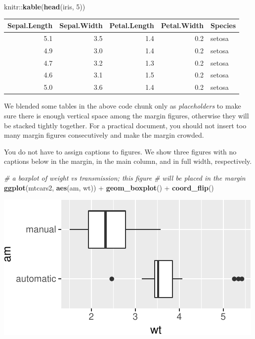 \documentclass[]{tufte-handout}
\newenvironment{Shaded}{}{}
\newcommand{\KeywordTok}[1]{\textcolor[rgb]{0.00,0.44,0.13}{\textbf{#1}}}
\newcommand{\DecValTok}[1]{\textcolor[rgb]{0.25,0.63,0.44}{#1}}
\newcommand{\StringTok}[1]{\textcolor[rgb]{0.25,0.44,0.63}{#1}}
\newcommand{\CommentTok}[1]{\textcolor[rgb]{0.38,0.63,0.69}{\textit{#1}}}
\newcommand{\OperatorTok}[1]{\textcolor[rgb]{0.40,0.40,0.40}{#1}}
\newcommand{\NormalTok}[1]{#1}
\begin{document}
\begin{Shaded}
\begin{Highlighting}[]
\NormalTok{knitr}\OperatorTok{::}\KeywordTok{kable}\NormalTok{(}\KeywordTok{head}\NormalTok{(iris, }\DecValTok{5}\NormalTok{))}
\end{Highlighting}
\end{Shaded}

\begin{longtable}[]{@{}rrrrl@{}}
\toprule
Sepal.Length & Sepal.Width & Petal.Length & Petal.Width &
Species\tabularnewline
\midrule
\endhead
5.1 & 3.5 & 1.4 & 0.2 & setosa\tabularnewline
4.9 & 3.0 & 1.4 & 0.2 & setosa\tabularnewline
4.7 & 3.2 & 1.3 & 0.2 & setosa\tabularnewline
4.6 & 3.1 & 1.5 & 0.2 & setosa\tabularnewline
5.0 & 3.6 & 1.4 & 0.2 & setosa\tabularnewline
\bottomrule
\end{longtable}

We blended some tables in the above code chunk only as
\emph{placeholders} to make sure there is enough vertical space among
the margin figures, otherwise they will be stacked tightly together. For
a practical document, you should not insert too many margin figures
consecutively and make the margin crowded.

You do not have to assign captions to figures. We show three figures
with no captions below in the margin, in the main column, and in full
width, respectively.

\begin{Shaded}
\begin{Highlighting}[]
\CommentTok{# a boxplot of weight vs transmission; this figure}
\CommentTok{# will be placed in the margin}
\KeywordTok{ggplot}\NormalTok{(mtcars2, }\KeywordTok{aes}\NormalTok{(am, wt)) }\OperatorTok{+}\StringTok{ }\KeywordTok{geom_boxplot}\NormalTok{() }\OperatorTok{+}
\StringTok{  }\KeywordTok{coord_flip}\NormalTok{()}
\end{Highlighting}
\end{Shaded}

\begin{marginfigure}
\includegraphics{handout-twitter-analysis_files/figure-latex/fig-nocap-margin-1} \end{marginfigure}
\end{document}
